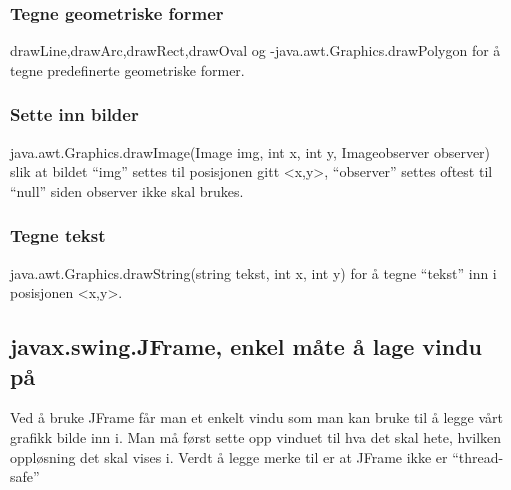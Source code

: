 \documentclass[norsk]{article}
\begin{document}
\subsubsection{Tegne geometriske former}
drawLine,drawArc,drawRect,drawOval og -java.awt.Graphics.drawPolygon
for å tegne predefinerte geometriske former.

\subsubsection{Sette inn bilder}
java.awt.Graphics.drawImage(Image img, int x, int y, Imageobserver observer)
slik at bildet ``img'' settes til posisjonen gitt <x,y>, ``observer'' settes
oftest til ``null'' siden observer ikke skal brukes.

\subsubsection{Tegne tekst}
java.awt.Graphics.drawString(string tekst, int x, int y) for å tegne
``tekst'' inn i posisjonen <x,y>.

\subsection{javax.swing.JFrame, enkel måte å lage vindu på}
Ved å bruke JFrame får man et enkelt vindu som man kan bruke til å 
legge vårt grafikk bilde inn i. Man må først sette opp vinduet til hva det
skal hete, hvilken oppløsning det skal vises i.
Verdt å legge merke til er at JFrame ikke er ``thread-safe''


\printbibliography
\end{document}
